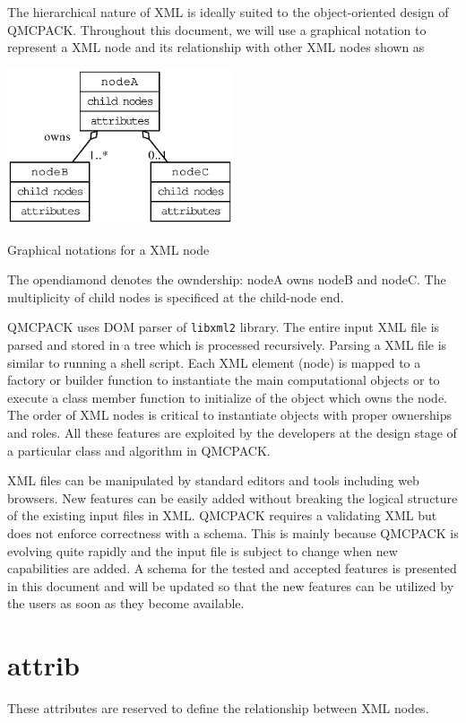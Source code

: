 The hierarchical nature of X\-M\-L is ideally suited to the object-\/oriented design of Q\-M\-C\-P\-A\-C\-K. Throughout this document, we will use a graphical notation to represent a X\-M\-L node and its relationship with other X\-M\-L nodes shown as 
\begin{DoxyImage}
\includegraphics[width=0.5\textwidth,height=\textheight/2,keepaspectratio=true]{dot_xmlsymbols}
\caption{Graphical notations for a X\-M\-L node}
\end{DoxyImage}
 The opendiamond denotes the owndership\-: node\-A owns node\-B and node\-C. The multiplicity of child nodes is specificed at the child-\/node end.

Q\-M\-C\-P\-A\-C\-K uses D\-O\-M parser of {\tt libxml2} library. The entire input X\-M\-L file is parsed and stored in a tree which is processed recursively. Parsing a X\-M\-L file is similar to running a shell script. Each X\-M\-L element (node) is mapped to a factory or builder function to instantiate the main computational objects or to execute a class member function to initialize of the object which owns the node. The order of X\-M\-L nodes is critical to instantiate objects with proper ownerships and roles. All these features are exploited by the developers at the design stage of a particular class and algorithm in Q\-M\-C\-P\-A\-C\-K.

X\-M\-L files can be manipulated by standard editors and tools including web browsers. New features can be easily added without breaking the logical structure of the existing input files in X\-M\-L. Q\-M\-C\-P\-A\-C\-K requires a validating X\-M\-L but does not enforce correctness with a schema. This is mainly because Q\-M\-C\-P\-A\-C\-K is evolving quite rapidly and the input file is subject to change when new capabilities are added. A schema for the tested and accepted features is presented in this document and will be updated so that the new features can be utilized by the users as soon as they become available.\section{attrib}\label{a00004_attribX}
These attributes are reserved to define the relationship between X\-M\-L nodes.


